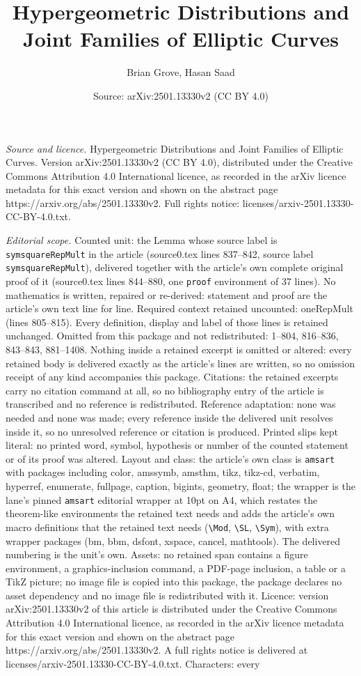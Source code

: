 \documentclass[10pt,a4paper]{amsart}
\title[Hypergeometric Distributions and Joint Families of Elliptic ]{Hypergeometric Distributions and Joint Families of Elliptic Curves}
\author{Brian Grove, Hasan Saad}
\date{Source: arXiv:2501.13330v2 (CC BY 4.0)}
\begin{document}
\maketitle

\noindent\emph{Source and licence.} Hypergeometric Distributions and Joint Families of Elliptic Curves. Version arXiv:2501.13330v2 (CC BY 4.0), distributed under the Creative Commons Attribution 4.0 International licence, as recorded in the arXiv licence metadata for this exact version and shown on the abstract page https://arxiv.org/abs/2501.13330v2. Full rights notice: licenses/arxiv-2501.13330-CC-BY-4.0.txt.\par\smallskip

\noindent\textit{Editorial scope.} Counted unit: the Lemma whose source label is \texttt{symsquareRepMult} in the article (source0.tex lines 837--842, source label \texttt{symsquareRepMult}), delivered together with the article's own complete original proof of it (source0.tex lines 844--880, one \texttt{proof} environment of 37 lines). No mathematics is written, repaired or re-derived: statement and proof are the article's own text line for line. Required context retained uncounted: oneRepMult (lines 805--815). Every definition, display and label of those lines is retained unchanged. Omitted from this package and not redistributed: 1--804, 816--836, 843--843, 881--1408. Nothing inside a retained excerpt is omitted or altered: every retained body is delivered exactly as the article's lines are written, so no omission receipt of any kind accompanies this package. Citations: the retained excerpts carry no citation command at all, so no bibliography entry of the article is transcribed and no reference is redistributed. Reference adaptation: none was needed and none was made; every reference inside the delivered unit resolves inside it, so no unresolved reference or citation is produced. Printed slips kept literal: no printed word, symbol, hypothesis or number of the counted statement or of its proof was altered. Layout and class: the article's own class is \texttt{amsart} with packages including color, amssymb, amsthm, tikz, tikz-cd, verbatim, hyperref, enumerate, fullpage, caption, bigints, geometry, float; the wrapper is the lane's pinned \texttt{amsart} editorial wrapper at 10pt on A4, which restates the theorem-like environments the retained text needs and adds the article's own macro definitions that the retained text needs (\texttt{\textbackslash Mod}, \texttt{\textbackslash SL}, \texttt{\textbackslash Sym}), with extra wrapper packages (bm, bbm, dsfont, xspace, cancel, mathtools). The delivered numbering is the unit's own. Assets: no retained span contains a figure environment, a graphics-inclusion command, a PDF-page inclusion, a table or a TikZ picture; no image file is copied into this package, the package declares no asset dependency and no image file is redistributed with it. Licence: version arXiv:2501.13330v2 of this article is distributed under the Creative Commons Attribution 4.0 International licence, as recorded in the arXiv licence metadata for this exact version and shown on the abstract page https://arxiv.org/abs/2501.13330v2. A full rights notice is delivered at licenses/arxiv-2501.13330-CC-BY-4.0.txt. Characters: every 
\end{document}
